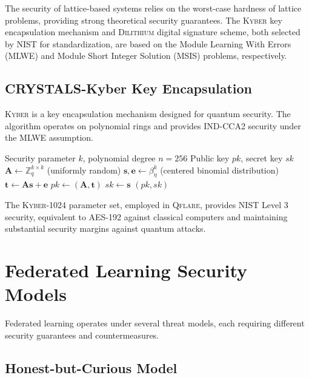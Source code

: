 \documentclass[12pt,a4paper,twoside]{book}
\newcommand{\qflare}{\textsc{Qflare}}
\newcommand{\kyber}{\textsc{Kyber}}
\newcommand{\dilithium}{\textsc{Dilithium}}
\begin{document}
The security of lattice-based systems relies on the worst-case hardness of lattice problems, providing strong theoretical security guarantees. The \kyber{} key encapsulation mechanism and \dilithium{} digital signature scheme, both selected by NIST for standardization, are based on the Module Learning With Errors (MLWE) and Module Short Integer Solution (MSIS) problems, respectively.

\subsection{CRYSTALS-Kyber Key Encapsulation}
\label{subsec:kyber}

\kyber{} is a key encapsulation mechanism designed for quantum security. The algorithm operates on polynomial rings and provides IND-CCA2 security under the MLWE assumption.

\begin{algorithm}
\caption{\kyber{} Key Generation}
\label{alg:kyber-keygen}
\begin{algorithmic}[1]
\REQUIRE Security parameter $k$, polynomial degree $n = 256$
\ENSURE Public key $pk$, secret key $sk$
\STATE $\mathbf{A} \leftarrow \mathbb{Z}_q^{k \times k}$ (uniformly random)
\STATE $\mathbf{s}, \mathbf{e} \leftarrow \beta_\eta^k$ (centered binomial distribution)
\STATE $\mathbf{t} \leftarrow \mathbf{A}\mathbf{s} + \mathbf{e}$
\STATE $pk \leftarrow (\mathbf{A}, \mathbf{t})$
\STATE $sk \leftarrow \mathbf{s}$
\RETURN $(pk, sk)$
\end{algorithmic}
\end{algorithm}

The \kyber{}-1024 parameter set, employed in \qflare{}, provides NIST Level 3 security, equivalent to AES-192 against classical computers and maintaining substantial security margins against quantum attacks.

\section{Federated Learning Security Models}
\label{sec:fl-security-models}

Federated learning operates under several threat models, each requiring different security guarantees and countermeasures.

\subsection{Honest-but-Curious Model}
\label{subsec:honest-curious}
\end{document}
